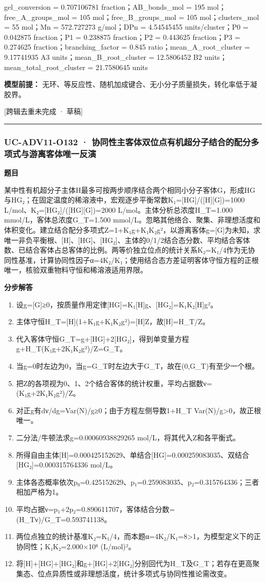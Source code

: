 \documentclass[UTF8,11pt,a4paper]{ctexart}
\begin{document}
gel\_conversion = 0.707106781 fraction；AB\_bonds\_mol = 195 mol；free\_A\_groups\_mol = 105 mol；free\_B\_groups\_mol = 105 mol；clusters\_mol = 55 mol；Mn = 572.727273 g/mol；DPn = 4.54545455 units/cluster；P0 = 0.042875 fraction；P1 = 0.238875 fraction；P2 = 0.443625 fraction；P3 = 0.274625 fraction；branching\_factor = 0.845 ratio；mean\_A\_root\_cluster = 9.17741935 A3 units；mean\_B\_root\_cluster = 12.5806452 B2 units；mean\_total\_root\_cluster = 21.7580645 units\par
\noindent\textbf{模型前提：}
无环、等反应性、随机加成键合、无小分子质量损失，转化率低于凝胶界。\par
\noindent\textcolor{red!65!black}{[跨辑去重未完成 · 草稿]} \par
\medskip\hrule\medskip
{}
\subsubsection*{UC-ADV11-O132 · 协同性主客体双位点有机超分子结合的配分多项式与游离客体唯一反演}
\noindent\textbf{题目}\par
某中性有机超分子主体H最多可按两步顺序结合两个相同小分子客体G，形成HG与HG₂；在固定温度的稀溶液中，宏观逐步平衡常数K₁=[HG]/([H][G])=1000 L/mol、K₂=[HG₂]/([HG][G])=2000 L/mol。主体分析总浓度H\_T=1.000 mmol/L，客体总浓度G\_T=1.500 mmol/L。忽略其他络合、聚集、非理想活度和体积变化。建立结合配分多项式Z=1+K₁g+K₁K₂g²，以游离客体g=[G]为未知，求唯一非负平衡根、[H]、[HG]、[HG₂]、主体的0/1/2结合态分数、平均结合客体数、已结合客体占总客体的比例。两等价独立位点的统计关系K₂=K₁/4作为无协同性基准，计算协同性因子α=4K₂/K₁；使用结合态方差证明客体守恒方程的正根唯一，核验双重物料守恒和稀溶液适用界限。\par
\medskip\noindent\textbf{分步解答}
\begin{enumerate}
\item 设g=[G]≥0，按质量作用定律[HG]=K₁[H]g、[HG₂]=K₁K₂[H]g²。
\item 主体守恒H\_T=[H](1+K₁g+K₁K₂g²)=[H]Z，故[H]=H\_T/Z。
\item 代入客体守恒G\_T=g+[HG]+2[HG₂]，得到单变量方程g+H\_T(K₁g+2K₁K₂g²)/Z=G\_T。
\item 当g=0时左边为0，当g=G\_T时左边大于G\_T，故在(0,G\_T)有至少一个根。
\item 把Z的各项视为0、1、2个结合客体的统计权重，平均占据数ν=(K₁g+2K₁K₂g²)/Z。
\item 对正g有dν/dg=Var(N)/g≥0；由于方程左侧导数1+H\_T Var(N)/g>0，故正根唯一。
\item 二分法/牛顿法求g=0.00060938829265 mol/L，将其代入Z和各平衡式。
\item 所得自由主体[H]=0.000425152629、单结合[HG]=0.000259083035、双结合[HG₂]=0.000315764336 mol/L。
\item 主体各态概率依次p₀=0.425152629、p₁=0.259083035、p₂=0.315764336；三者相加严格为1。
\item 平均占据ν=p₁+2p₂=0.890611707，客体结合分数=(H\_Tν)/G\_T=0.593741138。
\item 两位点独立的统计基准K₂=K₁/4，而本题α=4K₂/K₁=8>1，为模型定义下的正协同性；K₁K₂=2.000×10⁶ (L/mol)²。
\item 将[H]+[HG]+[HG₂]和g+[HG]+2[HG₂]分别回代为H\_T及G\_T；若存在更高聚集态、位点异质性或非理想活度，统计多项式与协同性推论需改变。
\end{enumerate}
\end{document}
